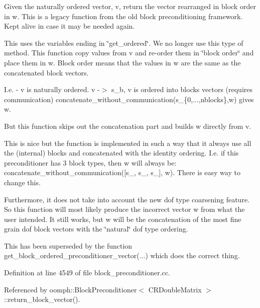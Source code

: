 Given the naturally ordered vector, v, return the vector rearranged in block order in w. This is a legacy function from the old block preconditioning framework. Kept alive in case it may be needed again. 

This uses the variables ending in \char`\"{}get\+\_\+ordered\char`\"{}. We no longer use this type of method. This function copy values from v and re-\/order them in \char`\"{}block order\char`\"{} and place them in w. Block order means that the values in w are the same as the concatenated block vectors.

I.\+e. -\/ v is naturally ordered. v -\/$>$ s\+\_\+b, v is ordered into blocks vectors (requires communication) concatenate\+\_\+without\+\_\+communication(s\+\_\+\{0,...,nblocks\},w) gives w.

But this function skips out the concatenation part and builds w directly from v.

This is nice but the function is implemented in such a way that it always use all the (internal) blocks and concatenated with the identity ordering. I.\+e. if this preconditioner has 3 block types, then w will always be\+: concatenate\+\_\+without\+\_\+communication(\mbox{[}s\+\_, s\+\_, s\+\_\mbox{]}, w). There is easy way to change this.

Furthermore, it does not take into account the new dof type coarsening feature. So this function will most likely produce the incorrect vector w from what the user intended. It still works, but w will be the concatenation of the most fine grain dof block vectors with the \char`\"{}natural\char`\"{} dof type ordering.

This has been superseded by the function get\+\_\+block\+\_\+ordered\+\_\+preconditioner\+\_\+vector(...) which does the correct thing. 

Definition at line 4549 of file block\+\_\+preconditioner.\+cc.



Referenced by oomph\+::\+Block\+Preconditioner$<$ C\+R\+Double\+Matrix $>$\+::return\+\_\+block\+\_\+vector().

\mbox{\label{classoomph_1_1BlockPreconditioner_ae3cf61f61e1aa50e2315e999827e7d59}} 
